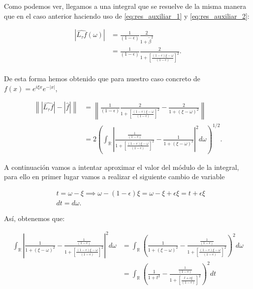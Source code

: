 \begin{observacion}
  \noindent Como podemos ver, llegamos a una integral que se resuelve de la misma manera que en el caso anterior haciendo uso de \eqref{eq:res_auxiliar_1} y \eqref{eq:res_auxiliar_2}:

  \begin{align*}
    |\widehat{L_\tau f}(\omega)| 
    &= \frac{1}{(1-\epsilon)} \frac{2}{1+\tilde{\beta}^2} \\
    &= \frac{1}{(1-\epsilon)} \frac{2}{1+\left[ \frac{(1-\epsilon) \xi - \omega}{(1-\epsilon)}\right]^2}. \\
  \end{align*}


  \noindent De esta forma hemos obtenido que para nuestro caso concreto de $f(x)=e^{i \xi x}e^{-|x|}$,


  \begin{align*}
    \left\| |\widehat{L_\tau f}|-|\widehat{f}| \right\| &= \left\| \frac{1}{(1-\epsilon)} \frac{2}{1+\left[ \frac{(1-\epsilon) \xi - \omega}{(1-\epsilon)}\right]^2}-\frac{2}{1+(\xi - \omega)^2} \right\| \\
    &= 2 \left(\int_{\mathbb{R}} \left| \frac{\frac{1}{(1-\epsilon)}}{1+\left[ \frac{(1-\epsilon) \xi - \omega}{(1-\epsilon)}\right]^2}-\frac{1}{1+(\xi - \omega)^2} \right|^2 d\omega\right)^{1/2}.
  \end{align*}


  \noindent A continuación vamos a intentar aproximar el valor del módulo de la integral, para ello en primer lugar vamos a realizar el siguiente cambio de variable 

  \begin{align*}
    &t=\omega-\xi \implies \omega-(1-\epsilon)\xi= \omega-\xi + \epsilon\xi = t +\epsilon\xi \\
    &dt=d\omega.
  \end{align*}

  \noindent Así, obtenemos que: 

  \begin{align*}
    \int_{\mathbb{R}} \left| \frac{1}{1+(\xi - \omega)^2} - \frac{\frac{1}{(1-\epsilon)}}{1+\left[ \frac{(1-\epsilon) \xi - \omega}{(1-\epsilon)}\right]^2} \right|^2 d\omega &=
    \int_{\mathbb{R}} \left(  \frac{1}{1+(\xi - \omega)^2} - \frac{\frac{1}{(1-\epsilon)}}{1+\left[ \frac{(1-\epsilon) \xi - \omega}{(1-\epsilon)}\right]^2}  \right)^2 d\omega \\
    &=\int_{\mathbb{R}} \left(  \frac{1}{1+t^2} - \frac{\frac{1}{(1-\epsilon)}}{1+\left[ \frac{t+\epsilon\xi}{(1-\epsilon)}\right]^2}  \right)^2 dt \\
  \end{align*}


\end{observacion}

